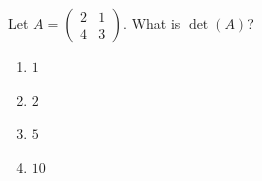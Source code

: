 \documentclass{article}
\begin{document}
\noindent
\begin{minipage}{0.65\linewidth}
Let $A = \begin{pmatrix} 2 & 1 \\ 4 & 3 \end{pmatrix}$. What is $\det(A)$?
\end{minipage}

\begin{enumerate}
  \item $1$
  \item $2$
  \item $5$
  \item $10$
\end{enumerate}
\end{document}
